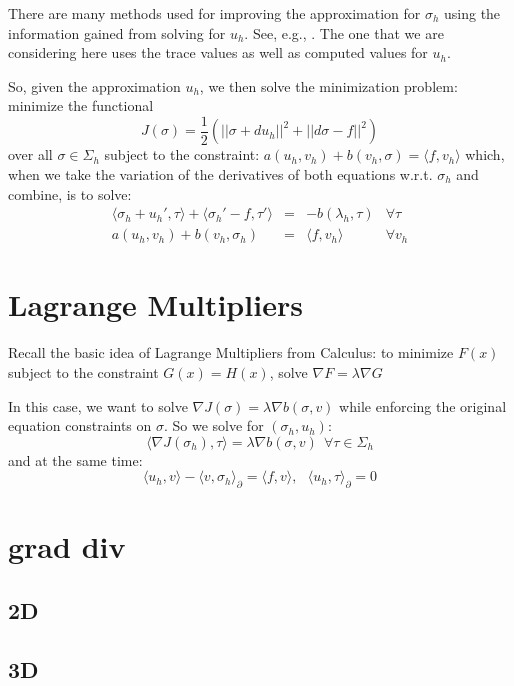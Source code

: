 \documentclass{article}
\begin{document}
There are many methods used for improving the approximation for $\sigma_h$ 
using the information gained from solving for $u_h$. 
See, e.g., \cite{ckk02}.
The one that we are 
considering here uses the trace values as well as computed values for $u_h$. 

So, given the approximation $u_h$, we then solve the minimization problem:
minimize the functional 
$$J(\sigma)=\frac{1}{2}\left(||\sigma+du_h||^2+||d\sigma-f||^2\right)$$
over all $\sigma\in\Sigma_h$ 
subject to the constraint: $a(u_h,v_h)+b(v_h,\sigma)=\langle f,v_h\rangle$
which, when we take the variation of the derivatives of 
both equations w.r.t. $\sigma_h$ and combine, is to solve: 
$$\begin{array}{rclr}
	\langle\sigma_h+u_h',\tau\rangle+\langle\sigma_h'-f,\tau'\rangle&=&
	-b(\lambda_h,\tau)&\forall\tau\\
	a(u_h,v_h)+b(v_h,\sigma_h)&=&\langle f,v_h\rangle&\forall v_h
\end{array}$$

\section{Lagrange Multipliers}
Recall the basic idea of Lagrange Multipliers from Calculus: 
to minimize $F(x)$ subject to the constraint $G(x) = H(x)$, 
solve $\nabla F=\lambda\nabla G$ 

In this case, we want to solve $\nabla J(\sigma)=\lambda\nabla b(\sigma,v)$ 
while enforcing the original equation constraints on $\sigma$. 
So we solve for $(\sigma_h, u_h)$: 
$$\langle\nabla J(\sigma_h),\tau\rangle=\lambda\nabla b(\sigma,v)~~
\forall\tau\in\Sigma_h$$
and at the same time:  
$$
\langle u_h,v\rangle-\langle v,\sigma_h\rangle_\partial=\langle f,v\rangle,~~~
\langle u_h,\tau\rangle_\partial = 0
$$

\section{grad div}
\subsection{2D}
\subsection{3D}
\end{document}
